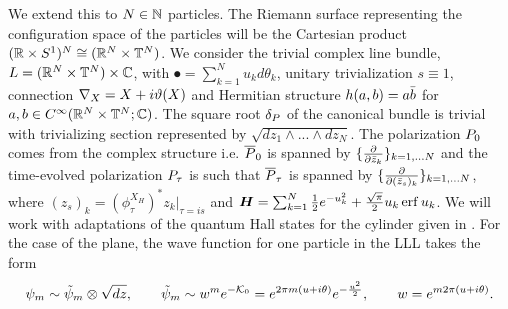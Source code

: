 \documentclass[notas.tex]{subfiles} 				%
\begin{document}
We extend this to $N \in \mathbb{N}$ particles. The Riemann surface representing the configuration space of the particles will be the Cartesian product $(\mathbb{R} \times S^1)^N \cong (\mathbb{R}^{N} \times \mathbb{T}^N)$. We consider the trivial complex line bundle, $L = (\mathbb{R}^{N} \times \mathbb{T}^N) \times \mathbb{C}$, with $\spot = \sum_{k=1}^{N} u_k d\theta_k$, unitary trivialization $s \equiv 1$, connection $\nabla_{X} =  X + i \vartheta(X)$ and Hermitian structure $h(a,b) = a \bar{b}$ for $a, b \in C^\infty(\mathbb{R}^{N} \times \mathbb{T}^N; \mathbb{C})$. The square root $\delta_P$ of the canonical bundle is trivial with trivializing section represented by $\sqrt{dz_1 \wedge ... \wedge dz_N}$. The polarization $P_0$ comes from the complex structure i.e. $\overline {P}_0$ is spanned by $\{\frac{\partial }{\partial \bar z_k}\}_{k=1,...N}$ and the time-evolved polarization $P_\tau$ is such that $\overline {P}_\tau$ is spanned by $\{\frac{\partial }{\partial  (\bar z_{s})_k}\}_{k=1,...N}$, where $(z_{s})_k = \left ( \phi_{\tau}^{X_H} \right )^* z_k \big|_{\tau=is}$ and $\bm{H} = \sum_{k=1}^{N} \frac{1}{2}e^{- u_k^2} + \frac{\sqrt{\pi}}{2}u_k\operatorname{erf}{u_k}$. 
We will work with adaptations of the quantum Hall states for the cylinder given in \cite{azuma_explicit_1994}. For the case of the plane, the wave function for one particle in the LLL takes the form
\begin{align*}
	\psi_{m} \sim \tilde \psi_m \otimes \sqrt{dz}, \qquad \tilde \psi_{m} \sim w^m e^{-\mathcal{K}_0} = e^{2 \pi m (u + i\theta)} e^{-\frac{u^2}{2}}, \qquad w = e^{m 2\pi (u+i\theta)}.
\end{align*}
\end{document}
